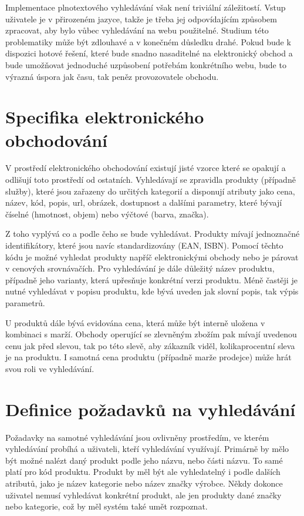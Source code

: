 \documentclass[FM,DP]{tulthesis}
\begin{document}
Implementace plnotextového vyhledávání však není triviální záležitostí. Vstup uživatele
je v přirozeném jazyce, takže je třeba jej odpovídajícím způsobem zpracovat, 
aby bylo vůbec vyhledávání na webu použitelné. Studium této problematiky
může být zdlouhavé a v konečném důsledku drahé. Pokud bude k dispozici hotové řešení, 
které bude snadno nasaditelné na elektronický obchod a bude umožňovat jednoduché 
uzpůsobení potřebám konkrétního webu, bude to výrazná úspora jak času, tak peněz
provozovatele obchodu.

\section{Specifika elektronického obchodování}

V prostředí elektronického obchodování existují jisté vzorce které se opakují a odlišují
toto prostředí od ostatních. Vyhledávají se zpravidla produkty (případně služby), které jsou
zařazeny do určitých kategorií a disponují atributy jako cena, název, kód, popis, url, obrázek, 
dostupnost a dalšími parametry, které bývají číselné (hmotnost, objem) nebo výčtové (barva, značka). 

Z toho vyplývá co a podle čeho se bude vyhledávat. Produkty mívají jednoznačné identifikátory, 
které jsou navíc standardizovány (EAN, ISBN). Pomocí těchto kódu je možné vyhledat produkty
napříč elektronickými obchody nebo je párovat v cenových srovnávačích. Pro vyhledávání
je dále důležitý název produktu, případně jeho varianty, která upřesňuje konkrétní
verzi produktu. Méně častěji je nutné vyhledávat v popisu produktu, kde bývá uveden
jak slovní popis, tak výpis parametrů. 

U produktů dále bývá evidována cena, která může být interně uložena v kombinaci s marží.
Obchody operující se zlevněným zbožím pak mívají uvedenou cenu jak před slevou, tak po této
slevě, aby zákazník viděl, kolikaprocentní sleva je na produktu. I samotná cena produktu
(případně marže prodejce) může hrát svou roli ve vyhledávání.

\section{Definice požadavků na vyhledávání}

Požadavky na samotné vyhledávání jsou ovlivněny prostředím, ve kterém vyhledávání
probíhá a uživateli, kteří vyhledávání využívají. Primárně by mělo být možné
nalézt daný produkt podle jeho názvu, nebo části názvu. To samé platí pro 
kód produktu. Produkt by měl být ale vyhledatelný i podle dalších atributů, 
jako je název kategorie nebo název značky výrobce. Někdy dokonce uživatel nemusí
vyhledávat konkrétní produkt, ale jen produkty dané značky nebo kategorie, což by
měl systém také umět rozpoznat.
\end{document}
